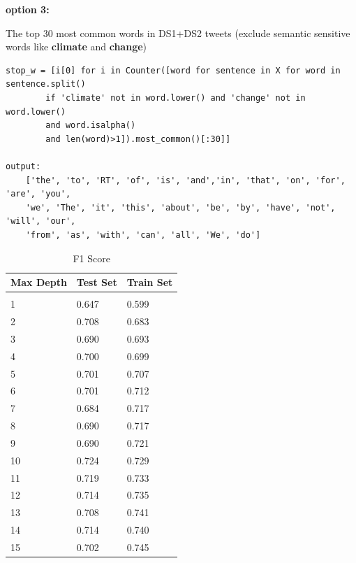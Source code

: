 \documentclass{article} %
\begin{document}
\textbf{option 3:}

The top 30 most common words in DS1+DS2 tweets (exclude semantic sensitive words like \textbf{climate} and \textbf{change})

\lstset{language=Python}
\lstset{frame=lines}
\lstset{basicstyle=\footnotesize}
\begin{lstlisting}
stop_w = [i[0] for i in Counter([word for sentence in X for word in sentence.split() 
		if 'climate' not in word.lower() and 'change' not in word.lower()
		and word.isalpha() 
		and len(word)>1]).most_common()[:30]]

output: 
	['the', 'to', 'RT', 'of', 'is',	'and','in', 'that', 'on', 'for', 'are',	'you', 
	'we', 'The', 'it', 'this', 'about', 'be', 'by', 'have', 'not', 'will', 'our', 
	'from', 'as', 'with', 'can', 'all', 'We', 'do']
\end{lstlisting}



\begin{table}[H]
	\caption{F1 Score}
	\label{sample-table}
	\begin{center}
		\begin{tabular}{|l|l|l|}
			\multicolumn{1}{c}{\bf Max Depth}  
			&\multicolumn{1}{c}{\bf Test Set}
			&\multicolumn{1}{c}{\bf Train Set}
			\\ \hline & &  \\
			1        &0.647 &0.599	 \\
			2        &0.708	&0.683	  \\
			3        &0.690	&0.693	 \\
			4        &0.700	&0.699	 \\
			5        &0.701	&0.707 \\
			6        &0.701 &0.712   \\
			7        &0.684 &0.717   \\
			8        &0.690 &0.717   \\
			9        &0.690 &0.721    \\
			10       &0.724  &0.729    \\
			11       &0.719  &0.733   \\
			12       &0.714 &0.735  \\
			13       &0.708 &0.741  \\
			14       &0.714 &0.740  \\
			15       &0.702 &0.745  \\
			\hline
		\end{tabular}
	\end{center}
\end{table}
\end{document}
